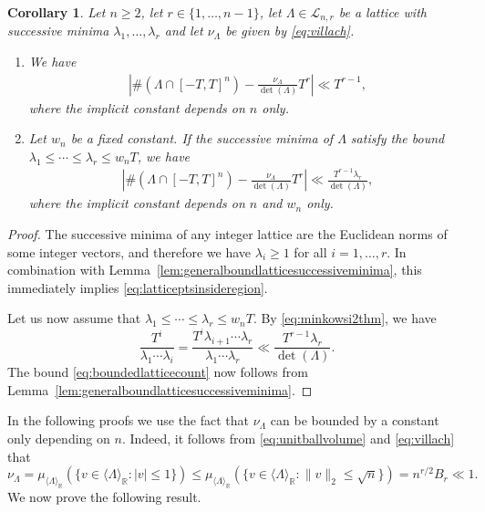 \documentclass[11pt,reqno]{amsart}
\newtheorem{cor}[thm]{Corollary}
\theoremstyle{definition}
\theoremstyle{remark}
\numberwithin{equation}{section}
\numberwithin{thm}{section}
\numberwithin{table}{section}
\def \R {{\mathbb R}}
\begin{document}
       \begin{cor}\label{lem:asymp_for_beta}
       Let $n \ge 2$, let $r \in \{ 1, \ldots, n-1\}$, let $\Lambda \in \mathcal{L}_{n,r}$ be a lattice with successive minima $\lambda_1, \ldots, \lambda_r$ and let $\nu_{\Lambda}$ be given by \eqref{eq:villach}. 
          \begin{enumerate}
              \item We have
              \begin{align}\label{eq:latticeptsinsideregion}
          \left|
            \# (\Lambda \cap [-T,T]^n) - \frac{\nu_\Lambda}{\det(\Lambda)} T^{r}
            \right| \ll T^{r-1} ,
          \end{align}
          where
          the implicit constant depends on $n$ only.
          \item Let $w_n$ be a fixed constant.  If the successive minima of $\Lambda$ satisfy the bound $\lambda_1  \le \cdots \le \lambda_r \le w_nT$, we have  
        \begin{align}\label{eq:boundedlatticecount}
            \left|
            \# (\Lambda \cap [-T,T]^n) - \frac{\nu_\Lambda}{\det(\Lambda)} T^{r}
            \right| \ll \frac{T^{r-1} \lambda_r}{\det(\Lambda)} ,
        \end{align}
where the implicit constant  depends on $n$ and $w_n$ only.
          \end{enumerate}       
    \end{cor}
\begin{proof}
    The successive minima of any integer lattice  are the Euclidean norms of some integer vectors, and therefore we have $\lambda_i \ge 1$ for all $i =1, \ldots, r$. In combination with Lemma~\ref{lem:generalboundlatticesuccessiveminima}, this immediately implies  \eqref{eq:latticeptsinsideregion}.

    Let us now assume that $\lambda_1 \le \cdots \le \lambda_r \le w_nT$.
   By  \eqref{eq:minkowsi2thm}, we have 
   \[
   \frac{T^i}{\lambda_1 \cdots \lambda_i} = \frac{T^i\lambda_{i+1} \cdots \lambda_r}{\lambda_1 \cdots \lambda_r} \ll \frac{T^{r-1}\lambda_r}{\det(\Lambda)}.
   \]
The bound  \eqref{eq:boundedlatticecount}
now follows from
 Lemma~\ref{lem:generalboundlatticesuccessiveminima}.
\end{proof}

In the following proofs we use the fact that $\nu_{\Lambda}$ can be bounded by a constant  only depending on $n$. Indeed, 
   it follows from  \eqref{eq:unitballvolume} and \eqref{eq:villach} that 
   \[
   \nu_{\Lambda} = \mu_{  \langle \Lambda\rangle_\R} 
   (
   \{ 
   v \in  \langle \Lambda\rangle_\R : |v| \le 1 
   \}) \le 
   \mu_{  \langle \Lambda\rangle_\R} 
   (
   \{ 
   v \in  \langle \Lambda\rangle_\R : \|v\|_2 \le \sqrt{n} 
   \}) = n^{r/2}B_r \ll 1.
   \]
   We now prove the following result. 
\end{document}
